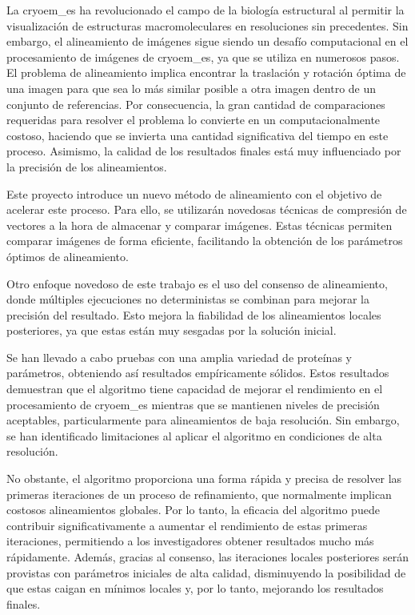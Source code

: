 \documentclass[../main.tex]{subfiles}
\begin{document}
La \gls{cryoem_es} ha revolucionado el campo de la biología estructural al permitir la visualización de estructuras macromoleculares en resoluciones sin precedentes. Sin embargo, el alineamiento de imágenes sigue siendo un desafío computacional en el procesamiento de imágenes de \gls{cryoem_es}, ya que se utiliza en numerosos pasos. El problema de alineamiento implica encontrar la traslación y rotación óptima de una imagen para que sea lo más similar posible a otra imagen dentro de un conjunto de referencias. Por consecuencia, la gran cantidad de comparaciones requeridas para resolver el problema lo convierte en un computacionalmente costoso, haciendo que se invierta una cantidad significativa del tiempo en este proceso. Asimismo, la calidad de los resultados finales está muy influenciado por la precisión de los alineamientos.

Este proyecto introduce un nuevo método de alineamiento con el objetivo de acelerar este proceso. Para ello, se utilizarán novedosas técnicas de compresión de vectores a la hora de almacenar y comparar imágenes. Estas técnicas permiten comparar imágenes de forma eficiente, facilitando la obtención de los parámetros óptimos de alineamiento.

Otro enfoque novedoso de este trabajo es el uso del consenso de alineamiento, donde múltiples ejecuciones no deterministas se combinan para mejorar la precisión del resultado. Esto mejora la fiabilidad de los alineamientos locales posteriores, ya que estas están muy sesgadas por la solución inicial.

Se han llevado a cabo pruebas con una amplia variedad de proteínas y parámetros, obteniendo así resultados empíricamente sólidos. Estos resultados demuestran que el algoritmo tiene capacidad de mejorar el rendimiento en el procesamiento de \gls{cryoem_es} mientras que se mantienen niveles de precisión aceptables, particularmente para alineamientos de baja resolución. Sin embargo, se han identificado limitaciones al aplicar el algoritmo en condiciones de alta resolución.

No obstante, el algoritmo proporciona una forma rápida y precisa de resolver las primeras iteraciones de un proceso de refinamiento, que normalmente implican costosos alineamientos globales. Por lo tanto, la eficacia del algoritmo puede contribuir significativamente a aumentar el rendimiento de estas primeras iteraciones, permitiendo a los investigadores obtener resultados mucho más rápidamente. Además, gracias al consenso, las iteraciones locales posteriores serán provistas con parámetros iniciales de alta calidad, disminuyendo la posibilidad de que estas caigan en mínimos locales y, por lo tanto, mejorando los resultados finales.
\end{document}
